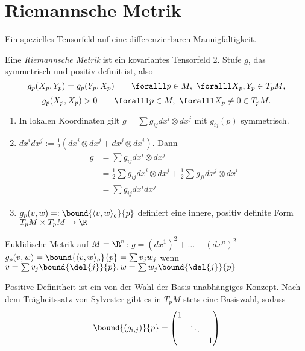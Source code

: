 \chapter{Riemannsche Metrik}

Ein spezielles Tensorfeld auf eine differenzierbaren Mannigfaltigkeit.

\begin{defn*}
	Eine \emph{Riemannsche Metrik} ist ein kovariantes Tensorfeld 2. Stufe $g$, das symmetrisch und positiv definit ist, also
	\[ g_p(X_p,Y_p) = g_p(Y_p,X_p) \qquad \foralll p \in M,\ \foralll X_p,Y_p \in T_pM, \]
	\[ g_p(X_p,X_p) > 0 \qquad \foralll p \in M,\ \foralll X_p \neq 0 \in T_pM. \]
\end{defn*}

\begin{rem*}
	\begin{enumerate}[label= {\roman*})]
		\item In lokalen Koordinaten gilt $ g = \sum g_{ij} dx^i \otimes dx^j $ mit $g_{ij}(p)$ symmetrisch.
		\item $ dx^idx^j := \frac{1}{2}(dx^i \otimes dx^j + dx^j \otimes dx^i) $. Dann
			\begin{align*}
				g &= \sum g_{ij} dx^i \otimes dx^j\\
				&= \frac{1}{2} \sum g_{ij} dx^i \otimes dx^j + \frac{1}{2} \sum g_{ji} dx^j \otimes dx^i\\
				&= \sum g_{ij} dx^idx^j
			\end{align*}
		\item $ g_p(v,w) =: \bound{\langle v,w\rangle_g}{p} $ definiert eine innere, positiv definite Form $ T_pM \times T_pM \to \R $
	\end{enumerate}
\end{rem*}

\begin{exmp*}
	Euklidische Metrik auf $M = \R^n$:
	$ g = (dx^1)^2 + \dots + (dx^n)^2 $\\
	$ g_p(v,w) = \bound{\langle v,w\rangle_g}{p} = \sum v_jw_j $ wenn $ v = \sum v_j \bound{\del{j}}{p}, w = \sum w_j \bound{\del{j}}{p}$
\end{exmp*}

\begin{rem}\label{6.1}
	Positive Definitheit ist ein von der Wahl der Basis unabhängiges Konzept. Nach dem Trägheitssatz von Sylvester gibt es in $T_pM$ stets eine Basiswahl, sodass
	\[ \bound{(g_{i,j})}{p} = \begin{pmatrix}
		1 & &\\
		& \ddots &\\
		&&1
	\end{pmatrix} \]
\end{rem}


